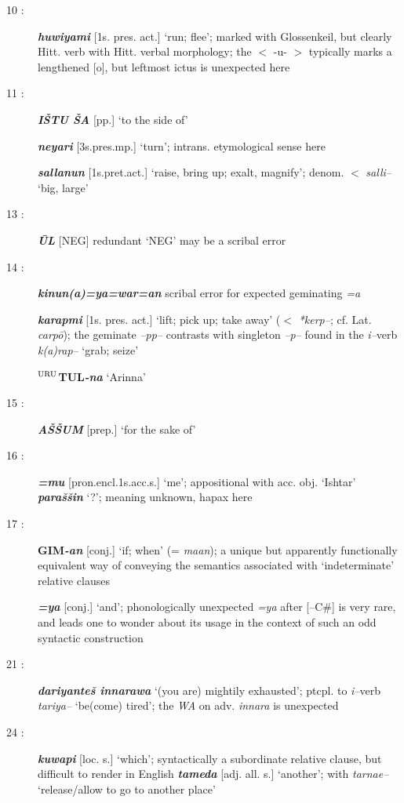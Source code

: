 \documentclass[10pt]{article}
\newcommand{\supersc}[1]{$^{\textrm{\scriptsize{#1}}}$}  	%
\newcommand{\bit}[1]{\textbf{\textit{#1}}}				%
\newcommand{\p}[1]{{\tiny[{#1}]}}					%
\newcommand{\hith}{\textsubwedge{h}}
\newcommand{\city}{\supersc{URU}}
\newcommand{\hiverb}{\textit{{\hith}i--}verb}
\renewcommand{\.}[1]{\textsubdot{#1}}
\begin{document}
\begin{description}
\item[10 :] \bit{huwiyami} \p{1s. pres. act.} `run; flee'; marked with Glossenkeil, but clearly Hitt. verb with Hitt. verbal morphology; the $<$ -u- $>$ typically marks a lengthened [o\textlengthmark], but leftmost ictus is unexpected here

\item[11 :] \bit{I\v{S}TU \v{S}A} \p{pp.} `to the side of' 

\bit{neyari} \p{3s.pres.mp.} `turn'; intrans. etymological sense here

\bit{sallanun} \p{1s.pret.act.} `raise, bring up; exalt, magnify'; denom. $<$ \textit{salli--} `big, large'

\item[13 :] \bit{\=UL} \p{NEG} redundant `NEG' may be a scribal error

\item[14 :] \bit{kinun(a)=ya=war=an} scribal error for expected geminating \textit{=a} 

\bit{karapmi} \p{1s. pres. act.} `lift; pick up; take away' ($<$ \textit{*kerp--}; cf. Lat. \textit{carp\=o}); the geminate \textit{--pp--} contrasts with singleton \textit{--p--} found in the {\hiverb} \textit{k(a)rap--} `grab; seize'

\textbf{{\city}TUL}\bit{-na} `Arinna'

\item[15 :] \bit{A\v{S}\v{S}UM} \p{prep.} `for the sake of'

\item[16 :] \bit{=mu} \p{pron.encl.1s.acc.s.} `me'; appositional with acc. obj. `Ishtar' \bit{para\v{s}\v{s}in} `?'; meaning unknown, hapax here

\item[17 :] \textbf{GIM}\bit{-an} \p{conj.} `if; when' (= \textit{ma{\hith}{\hith}an}); a unique but apparently functionally equivalent way of conveying the semantics associated with `indeterminate' relative clauses

\bit{=ya} \p{conj.} `and';  phonologically unexpected \textit{=ya} after [--C\#] is very rare, and leads one to wonder about its usage in the context of such an odd syntactic construction

\item[21 :] \bit{dariyante\v{s} innarawa} `(you are) mightily exhausted'; ptcpl. to {\hiverb} \textit{tariya--} `be(come) tired'; the \textit{WA} on adv. \textit{innara} is unexpected

\item[24 :] \bit{kuwapi} \p{loc. s.} `which'; syntactically a subordinate relative clause, but difficult to render in English \bit{tameda} \p{adj. all. s.} `another'; with \textit{tarnae--} `release/allow to go to another place'


\end{description}
\end{document}
